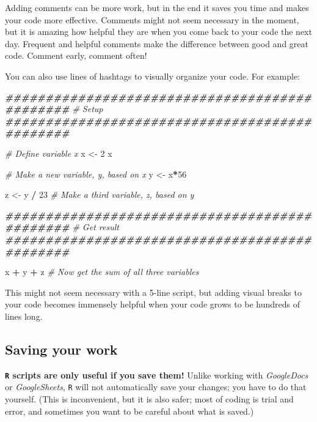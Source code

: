 \documentclass[
]{book}
\newenvironment{Shaded}{\begin{snugshade}}{\end{snugshade}}
\newcommand{\CommentTok}[1]{\textcolor[rgb]{0.56,0.35,0.01}{\textit{#1}}}
\newcommand{\DecValTok}[1]{\textcolor[rgb]{0.00,0.00,0.81}{#1}}
\newcommand{\DocumentationTok}[1]{\textcolor[rgb]{0.56,0.35,0.01}{\textbf{\textit{#1}}}}
\newcommand{\NormalTok}[1]{#1}
\newcommand{\OtherTok}[1]{\textcolor[rgb]{0.56,0.35,0.01}{#1}}
\newcommand{\SpecialCharTok}[1]{\textcolor[rgb]{0.81,0.36,0.00}{\textbf{#1}}}
\begin{document}
Adding comments can be more work, but in the end it saves you time and makes your code more effective. Comments might not seem necessary in the moment, but it is amazing how helpful they are when you come back to your code the next day. Frequent and helpful comments make the difference between good and great code. Comment early, comment often!

You can also use lines of hashtags to visually organize your code. For example:

\begin{Shaded}
\begin{Highlighting}[]
\DocumentationTok{\#\#\#\#\#\#\#\#\#\#\#\#\#\#\#\#\#\#\#\#\#\#\#\#\#\#\#\#\#\#\#\#\#\#\#\#\#\#\#\#\#\#\#\#\#\#}
\CommentTok{\# Setup}
\DocumentationTok{\#\#\#\#\#\#\#\#\#\#\#\#\#\#\#\#\#\#\#\#\#\#\#\#\#\#\#\#\#\#\#\#\#\#\#\#\#\#\#\#\#\#\#\#\#\#}

\CommentTok{\# Define variable x}
\NormalTok{x }\OtherTok{\textless{}{-}} \DecValTok{2} 
\NormalTok{x}

\CommentTok{\# Make a new variable, y, based on x}
\NormalTok{y }\OtherTok{\textless{}{-}}\NormalTok{ x}\SpecialCharTok{*}\DecValTok{56}

\NormalTok{z }\OtherTok{\textless{}{-}}\NormalTok{ y }\SpecialCharTok{/} \DecValTok{23} \CommentTok{\# Make a third variable, z, based on y}
 

\DocumentationTok{\#\#\#\#\#\#\#\#\#\#\#\#\#\#\#\#\#\#\#\#\#\#\#\#\#\#\#\#\#\#\#\#\#\#\#\#\#\#\#\#\#\#\#\#\#\#}
\CommentTok{\# Get result}
\DocumentationTok{\#\#\#\#\#\#\#\#\#\#\#\#\#\#\#\#\#\#\#\#\#\#\#\#\#\#\#\#\#\#\#\#\#\#\#\#\#\#\#\#\#\#\#\#\#\#}

\NormalTok{x }\SpecialCharTok{+}\NormalTok{ y }\SpecialCharTok{+}\NormalTok{ z }\CommentTok{\# Now get the sum of all three variables}
\end{Highlighting}
\end{Shaded}

This might not seem necessary with a 5-line script, but adding visual breaks to your code becomes immensely helpful when your code grows to be hundreds of lines long.

\subsection*{Saving your work}\label{saving-your-work}

\textbf{\texttt{R} scripts are only useful if you save them!} Unlike working with \emph{GoogleDocs} or \emph{GoogleSheets}, \texttt{R} will not automatically save your changes; you have to do that yourself. (This is inconvenient, but it is also safer; most of coding is trial and error, and sometimes you want to be careful about what is saved.)
\end{document}
